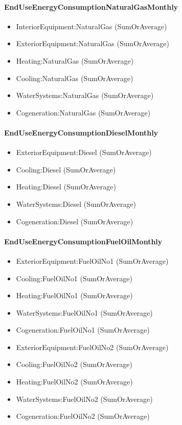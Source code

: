 \paragraph{EndUseEnergyConsumptionNaturalGasMonthly}\label{enduseenergyconsumptionnaturalgasmonthly}

\begin{itemize}
\item
  InteriorEquipment:NaturalGas (SumOrAverage)
\item
  ExteriorEquipment:NaturalGas (SumOrAverage)
\item
  Heating:NaturalGas (SumOrAverage)
\item
  Cooling:NaturalGas (SumOrAverage)
\item
  WaterSystems:NaturalGas (SumOrAverage)
\item
  Cogeneration:NaturalGas (SumOrAverage)
\end{itemize}

\paragraph{EndUseEnergyConsumptionDieselMonthly}\label{enduseenergyconsumptiondieselmonthly}

\begin{itemize}
\item
  ExteriorEquipment:Diesel (SumOrAverage)
\item
  Cooling:Diesel (SumOrAverage)
\item
  Heating:Diesel (SumOrAverage)
\item
  WaterSystems:Diesel (SumOrAverage)
\item
  Cogeneration:Diesel (SumOrAverage)
\end{itemize}

\paragraph{EndUseEnergyConsumptionFuelOilMonthly}\label{enduseenergyconsumptionfueloilmonthly}

\begin{itemize}
\item
  ExteriorEquipment:FuelOilNo1 (SumOrAverage)
\item
  Cooling:FuelOilNo1 (SumOrAverage)
\item
  Heating:FuelOilNo1 (SumOrAverage)
\item
  WaterSystems:FuelOilNo1 (SumOrAverage)
\item
  Cogeneration:FuelOilNo1 (SumOrAverage)
\item
  ExteriorEquipment:FuelOilNo2 (SumOrAverage)
\item
  Cooling:FuelOilNo2 (SumOrAverage)
\item
  Heating:FuelOilNo2 (SumOrAverage)
\item
  WaterSystems:FuelOilNo2 (SumOrAverage)
\item
  Cogeneration:FuelOilNo2 (SumOrAverage)
\end{itemize}

